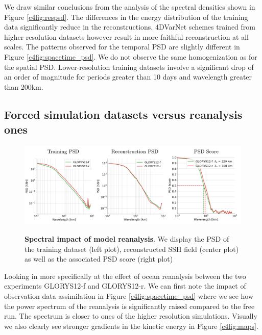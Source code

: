 \begin{bibunit}
We draw similar conclusions from the analysis of 
the spectral densities shown in Figure \ref{c4fig:respsd}. The differences in the energy distribution of the training data significantly reduce in the reconstructions. 4DVarNet schemes trained from higher-resolution datasets however result in more faithful reconstruction at all scales.
The patterns observed for the temporal PSD are slightly different in Figure \ref{c4fig:spacetime_psd}. We do not observe the same homogenization as for the spatial PSD. Lower-resolution training datasets involve a significant drop 
of an order of magnitude for periods greater than 10 days and wavelength greater than 200km.

\subsection*{Forced simulation datasets versus reanalysis ones}
\label{c4ssec:reanalysis}

\begin{figure}[ht]
\small
\begin{center}
    
\includegraphics[width=\linewidth]{./00_Simulearning/standalone_figures/psd_rea.png}
\caption{\textbf{Spectral impact of model reanalysis}. We display the PSD of the training dataset (left plot), reconstructed SSH field (center plot) as well as the associated PSD score (right plot)}
\vspace{-5mm}
\label{c4fig:reapsd}
\end{center}
\end{figure}
Looking in more specifically at the effect of ocean reanalysis between the two experiments GLORYS12-f and GLORYS12-r. We can first note the impact of observation data assimilation in Figure \ref{c4fig:spacetime_psd} where we see how the power spectrum of the reanalysis is significantly raised compared to the free run. The spectrum is closer to ones of the higher resolution simulations. Visually we also clearly see stronger gradients in the kinetic energy in Figure \ref{c4fig:maps}.


\end{bibunit}
